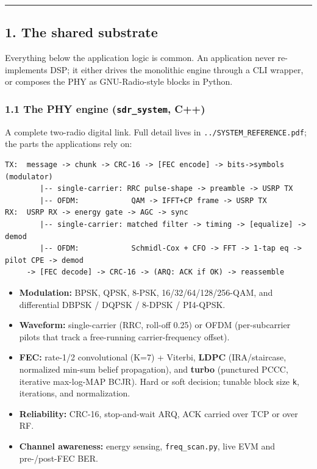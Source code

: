 \documentclass[
  10pt,
]{article}
\providecommand{\tightlist}{%
  \setlength{\itemsep}{0pt}\setlength{\parskip}{0pt}}
\begin{document}
\begin{center}\rule{0.5\linewidth}{0.5pt}\end{center}

\hypertarget{1-the-shared-substrate}{%
\subsection{1. The shared substrate}\label{1-the-shared-substrate}}

Everything below the application logic is common. An application never
re-implements DSP; it either drives the monolithic engine through a CLI
wrapper, or composes the PHY as GNU-Radio-style blocks in Python.

\hypertarget{11-the-phy-engine-sdr_system-c}{%
\subsubsection{\texorpdfstring{1.1 The PHY engine (\texttt{sdr\_system},
C++)}{1.1 The PHY engine (sdr\_system, C++)}}\label{11-the-phy-engine-sdr_system-c}}

A complete two-radio digital link. Full detail lives in
\texttt{../SYSTEM\_REFERENCE.pdf}; the parts the applications rely on:

\begin{verbatim}
TX:  message -> chunk -> CRC-16 -> [FEC encode] -> bits->symbols (modulator)
        |-- single-carrier: RRC pulse-shape -> preamble -> USRP TX
        |-- OFDM:            QAM -> IFFT+CP frame -> USRP TX
RX:  USRP RX -> energy gate -> AGC -> sync
        |-- single-carrier: matched filter -> timing -> [equalize] -> demod
        |-- OFDM:            Schmidl-Cox + CFO -> FFT -> 1-tap eq -> pilot CPE -> demod
     -> [FEC decode] -> CRC-16 -> (ARQ: ACK if OK) -> reassemble
\end{verbatim}

\begin{itemize}
\tightlist
\item
  \textbf{Modulation:} BPSK, QPSK, 8-PSK, 16/32/64/128/256-QAM, and
  differential DBPSK / DQPSK / 8-DPSK / PI4-QPSK.
\item
  \textbf{Waveform:} single-carrier (RRC, roll-off 0.25) or OFDM
  (per-subcarrier pilots that track a free-running carrier-frequency
  offset).
\item
  \textbf{FEC:} rate-1/2 convolutional (K=7) + Viterbi, \textbf{LDPC}
  (IRA/staircase, normalized min-sum belief propagation), and
  \textbf{turbo} (punctured PCCC, iterative max-log-MAP BCJR). Hard or
  soft decision; tunable block size \texttt{k}, iterations, and
  normalization.
\item
  \textbf{Reliability:} CRC-16, stop-and-wait ARQ, ACK carried over TCP
  or over RF.
\item
  \textbf{Channel awareness:} energy sensing, \texttt{freq\_scan.py},
  live EVM and pre-/post-FEC BER.
\end{itemize}
\end{document}
